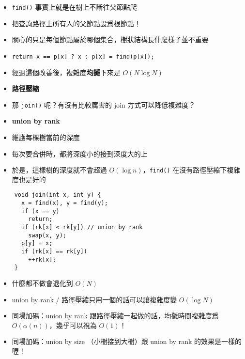 \documentclass[standalone]{beamer}
\begin{document}
\begin{frame}[fragile]{}
  \begin{itemize}
    \item \texttt{find()} 事實上就是在樹上不斷往父節點爬
    \item 把查詢路徑上所有人的父節點設爲根節點！
    \item 關心的只是每個節點屬於哪個集合，樹狀結構長什麼樣子並不重要
    \item \texttt{return x == p[x] ? x : p[x] = find(p[x]);}
    \item 經過這個改善後，複雜度\textbf{均攤}下來是 $O(N \log N)$
    \item \textbf{路徑壓縮}
  \end{itemize}
\end{frame}

\begin{frame}[fragile]{}
  \begin{itemize}
    \item 那 \texttt{join()} 呢？有沒有比較厲害的 join 方式可以降低複雜度？
    \item \textbf{union by rank}
    \item 維護每棵樹當前的深度
    \item 每次要合併時，都將深度小的接到深度大的上
    \item 於是，這樣樹的深度就不會超過 $O(\log n)$，\texttt{find()} 在沒有路徑壓縮下複雜度也是好的
  \end{itemize}
\end{frame}

\begin{frame}[fragile]{}
  \begin{verbatim}
    void join(int x, int y) {
      x = find(x), y = find(y);
      if (x == y)
        return;
      if (rk[x] < rk[y]) // union by rank
        swap(x, y);
      p[y] = x;
      if (rk[x] == rk[y])
        ++rk[x];
    }
  \end{verbatim}
\end{frame}

\begin{frame}[fragile]{}
  \begin{itemize}
    \item 什麼都不做會退化到 $O(N)$
    \item union by rank / 路徑壓縮只用一個的話可以讓複雜度變 $O(\log N)$
    \item 同場加碼：union by rank 跟路徑壓縮一起做的話，均攤時間複雜度爲 $O( \alpha( n ) )$，幾乎可以視為 $O(1)$！
    \item 同場加碼：union by size （小樹接到大樹）跟 union by rank 的效果是一樣的喔！
  \end{itemize}
\end{frame}
\end{document}
